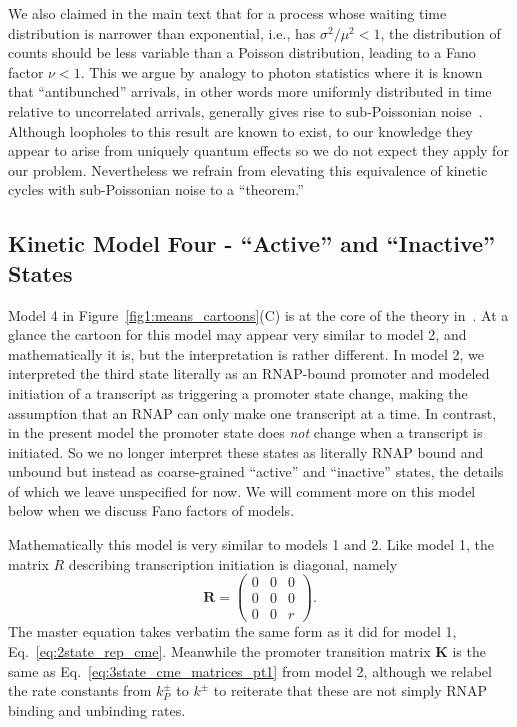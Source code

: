 We also claimed in the main text that for a process whose waiting time
distribution is narrower than exponential, i.e., has $\sigma^2/\mu^2<1$,
the distribution of counts should be less variable than a Poisson
distribution, leading to a Fano factor $\nu<1$.
This we argue by analogy to photon statistics where it is known that
``antibunched'' arrivals, in other words more uniformly distributed in
time relative to uncorrelated arrivals, generally gives rise to
sub-Poissonian noise~\cite{Paul1982, Zou1990}. Although loopholes to this
result are known to exist, to our knowledge they appear to arise from
uniquely quantum effects so we do not expect they apply for our problem.
Nevertheless we refrain from elevating this equivalence of
kinetic cycles with sub-Poissonian noise to a ``theorem.''

\subsection{Kinetic Model Four - ``Active'' and ``Inactive'' States}
Model 4 in Figure~\ref{fig1:means_cartoons}(C) is at the core of the theory
in~\cite{Razo-Mejia2020}. At a glance the cartoon for this model may appear very
similar to model 2, and mathematically it is, but the interpretation is rather
different. In model 2, we interpreted the third state literally as an RNAP-bound
promoter and modeled initiation of a transcript as triggering a promoter state
change, making the assumption that an RNAP can only
make one transcript at a time. In contrast, in the present model the promoter
state does \textit{not} change when a transcript is initiated. So we no longer
interpret these states as literally RNAP bound and unbound but instead as
coarse-grained ``active'' and ``inactive'' states, the details of which we leave
unspecified for now. We will comment more on this model below when we discuss
Fano factors of models.

Mathematically this model is very similar to models 1 and 2. Like model 1, the
matrix $R$ describing transcription initiation is diagonal, namely
\begin{equation}
\mathbf{R} = \begin{pmatrix}
                0 & 0 & 0 \\ 
                0 & 0 & 0 \\ 
                0 & 0 & r
        \end{pmatrix}.
\end{equation}
The master equation takes verbatim the same form as it did for model 1,
Eq.~\ref{eq:2state_rep_cme}. Meanwhile the promoter transition
matrix $\mathbf{K}$ is the same as Eq.~\ref{eq:3state_cme_matrices_pt1}
from model 2, although we relabel the
rate constants from $k_P^\pm$ to $k^\pm$ to reiterate that these are not simply
RNAP binding and unbinding rates.

